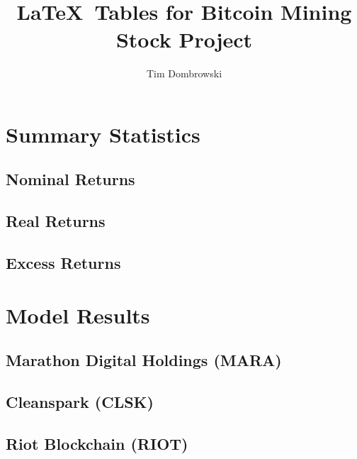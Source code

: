 \documentclass[]{article}
\title{\LaTeX~Tables for Bitcoin Mining Stock Project}
\author{Tim Dombrowski}
\begin{document}
\maketitle

\large

\section{Summary Statistics}

\subsection{Nominal Returns}



\pagebreak

\subsection{Real Returns}



\pagebreak

\subsection{Excess Returns}



\pagebreak

\section{Model Results}

\subsection{Marathon Digital Holdings (MARA)}



\pagebreak

\subsection{Cleanspark (CLSK)}



\pagebreak

\subsection{Riot Blockchain (RIOT)}
\end{document}
